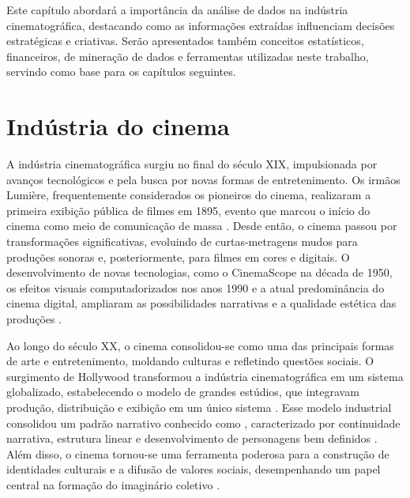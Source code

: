 \newcommand{\texCommand}[1]{\texttt{\textbackslash{#1}}}%

\newcommand{\exemplo}[1]{%
\vspace{\baselineskip}%
\noindent\fbox{\begin{minipage}{\textwidth}#1\end{minipage}}%
\\\vspace{\baselineskip}}%

\newcommand{\exemploVerbatim}[1]{%
\vspace{\baselineskip}%
\noindent\fbox{\begin{minipage}{\textwidth}%
#1\end{minipage}}%
\\\vspace{\baselineskip}}%


Este capítulo abordará a importância da análise de dados na indústria cinematográfica, destacando como as informações extraídas influenciam decisões estratégicas e criativas. Serão apresentados também conceitos estatísticos, financeiros, de mineração de dados e ferramentas utilizadas neste trabalho, servindo como base para os capítulos seguintes.

\section{Indústria do cinema}
A indústria cinematográfica surgiu no final do século XIX, impulsionada por avanços tecnológicos e pela busca por novas formas de entretenimento. Os irmãos Lumière, frequentemente considerados os pioneiros do cinema, realizaram a primeira exibição pública de filmes em 1895, evento que marcou o início do cinema como meio de comunicação de massa \cite{monaco2009how}. Desde então, o cinema passou por transformações significativas, evoluindo de curtas-metragens mudos para produções sonoras e, posteriormente, para filmes em cores e digitais. O desenvolvimento de novas tecnologias, como o CinemaScope na década de 1950, os efeitos visuais computadorizados nos anos 1990 e a atual predominância do cinema digital, ampliaram as possibilidades narrativas e a qualidade estética das produções \cite{bordwell2013film}.

Ao longo do século XX, o cinema consolidou-se como uma das principais formas de arte e entretenimento, moldando culturas e refletindo questões sociais. O surgimento de Hollywood transformou a indústria cinematográfica em um sistema globalizado, estabelecendo o modelo de grandes estúdios, que integravam produção, distribuição e exibição em um único sistema \cite{bordwell2013film}. Esse modelo industrial consolidou um padrão narrativo conhecido como , caracterizado por continuidade narrativa, estrutura linear e desenvolvimento de personagens bem definidos \cite{maltby2003hollywood}. Além disso, o cinema tornou-se uma ferramenta poderosa para a construção de identidades culturais e a difusão de valores sociais, desempenhando um papel central na formação do imaginário coletivo \cite{monaco2009how}.

